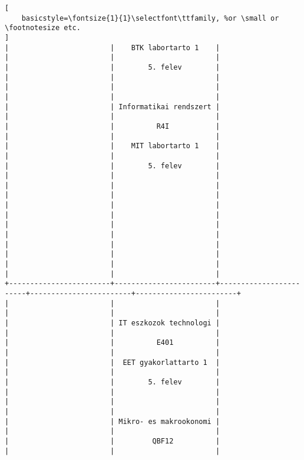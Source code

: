 \begin{lstlisting}[
    basicstyle=\fontsize{1}{1}\selectfont\ttfamily, %or \small or \footnotesize etc.
]
|                        |    BTK labortarto 1    |                        |                        |                        | 
|                        |        5. felev        |                        |                        |                        | 
|                        |                        |                        |                        |                        | 
|                        | Informatikai rendszert |                        |                        |                        | 
|                        |          R4I           |                        |                        |                        | 
|                        |    MIT labortarto 1    |                        |                        |                        | 
|                        |        5. felev        |                        |                        |                        | 
|                        |                        |                        |                        |                        | 
|                        |                        |                        |                        |                        | 
|                        |                        |                        |                        |                        | 
|                        |                        |                        |                        |                        | 
|                        |                        |                        |                        |                        | 
+------------------------+------------------------+------------------------+------------------------+------------------------+
|                        |                        |                        |                        |                        | 
|                        | IT eszkozok technologi |                        |                        |                        | 
|                        |          E401          |                        |                        |                        | 
|                        |  EET gyakorlattarto 1  |                        |                        |                        | 
|                        |        5. felev        |                        |                        |                        | 
|                        |                        |                        |                        |                        | 
|                        | Mikro- es makrookonomi |                        |                        |                        | 
|                        |         QBF12          |                        |                        |                        | 

\end{lstlisting}

